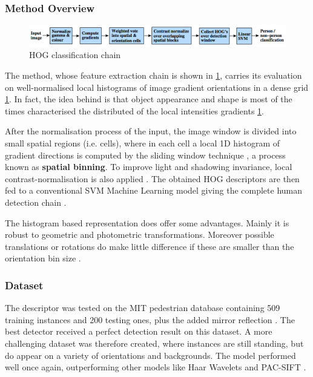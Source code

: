 \subsubsection{Method Overview}

\begin{figure}[!htbp]
\begin{center}
\includegraphics[width=\linewidth]{images/hog_chain.png}
\end{center}
\caption{HOG classification chain \cite{paper:dalal2005histograms}}
\label{fig:hog_chain}
\end{figure}

The method, whose feature extraction chain is shown in \ref{fig:hog_chain}, carries its evaluation on well-normalised local histograms of image gradient orientations in a dense grid \ref{fig:hog_chain}. In fact, the idea behind is that object appearance and shape is most of the times characterised the distributed of the local intensities gradients \ref{fig:hog_chain}.

After the normalisation process of the input, the image window is divided into small spatial regions (i.e. cells), where in each cell a local 1D histogram of gradient directions is computed by the sliding window technique \cite{paper:dalal2005histograms}, a process known as \textbf{spatial binning}. To improve light and shadowing invariance, local contrast-normalisation is also applied \cite{paper:dalal2005histograms}. The obtained HOG descriptors are then fed to a conventional SVM Machine Learning model giving the complete human detection chain \cite{paper:dalal2005histograms}.

The histogram based representation does offer some advantages. Mainly it is robust to geometric and photometric transformations. Moreover possible translations or rotations do make little difference if these are smaller than the orientation bin size \cite{paper:dalal2005histograms}.

\subsubsection{Dataset}

The descriptor was tested on the MIT pedestrian database containing 509 training instances and 200 testing ones, plus the added mirror reflection \cite{paper:dalal2005histograms}. The best detector received a perfect detection result on this dataset. A more challenging dataset was therefore created, where instances are still standing, but do appear on a variety of orientations and backgrounds. The model performed well once again, outperforming other models like Haar Wavelets \cite{oren1997pedestrian} and PAC-SIFT \cite{zhang2012adaptive} \cite{paper:dalal2005histograms}.

